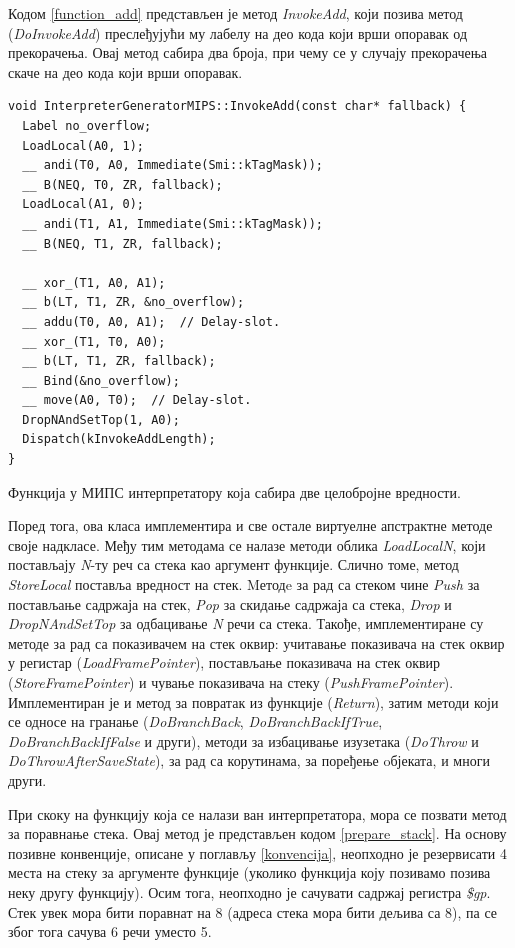 \documentclass[12pt,oneside]{memoir}
\begin{document}
Кодом \ref{function_add} представљен је метод \textit{InvokeAdd}, који позива метод (\textit{DoInvokeAdd}) преслеђујући му лабелу на део кода који врши опоравак од прекорачења. Овај метод сабира два броја, при чему се у случају прекорачења скаче на део кода који врши опоравак.

\begin{listing}
\begin{verbatim}
void InterpreterGeneratorMIPS::InvokeAdd(const char* fallback) {
  Label no_overflow;
  LoadLocal(A0, 1);
  __ andi(T0, A0, Immediate(Smi::kTagMask));
  __ B(NEQ, T0, ZR, fallback);
  LoadLocal(A1, 0);
  __ andi(T1, A1, Immediate(Smi::kTagMask));
  __ B(NEQ, T1, ZR, fallback);

  __ xor_(T1, A0, A1);
  __ b(LT, T1, ZR, &no_overflow);
  __ addu(T0, A0, A1);  // Delay-slot.
  __ xor_(T1, T0, A0);
  __ b(LT, T1, ZR, fallback);
  __ Bind(&no_overflow);
  __ move(A0, T0);  // Delay-slot.
  DropNAndSetTop(1, A0);
  Dispatch(kInvokeAddLength);
}
\end{verbatim}
\caption{Функција у МИПС интерпретатору која сабира две целобројне вредности.}
\label{function_add}
\end{listing}

Поред тога, ова класа имплементира и све остале виртуелне апстрактне методе своје надкласе. Међу тим методама се налазе методи облика \textit{LoadLocalN}, који постављају \textit{N}-ту реч са стека као аргумент функције. Слично томе, метод \textit{StoreLocal} поставља вредност на стек. Mетодe за рад са стеком чине \textit{Push} за постављање садржаја на стек, \textit{Pop} за скидање садржаја са стека, \textit{Drop} и \textit{DropNAndSetTop} за одбацивање \textit{N} речи са стека. Такође, имплементиране су методе за рад са показивачем на стек оквир: учитавање показивача на стек оквир у регистар (\textit{LoadFramePointer}), постављање показивача на стек оквир (\textit{StoreFramePointer}) и чување показивача на стеку (\textit{PushFramePointer}). Имплементиран је и метод за повратак из функције (\textit{Return}), затим методи који се односе на гранање (\textit{DoBranchBack}, \textit{DoBranchBackIfTrue}, \textit{DoBranchBackIfFalse} и други), методи за избацивање изузетака (\textit{DoThrow} и \textit{DoThrowAfterSaveState}), за рад са корутинама, за поређење oбјеката, и многи други.

При скоку на функцију која се налази ван интерпретатора, мора се позвати метод за поравнање стека. Овај метод је представљен кодом \ref{prepare_stack}. На основу позивне конвенције, описане у поглављу \ref{konvencija}, неопходно је резервисати 4 места на стеку за аргументе функције (уколико функција коју позивамо позива неку другу функцију). Осим тога, неопходно је сачувати садржај регистра \textit{\$gp}. Стек увек мора бити поравнат на 8 (адреса стека мора бити дељива са 8), па се због тога сачува 6 речи уместо 5.
\end{document}
